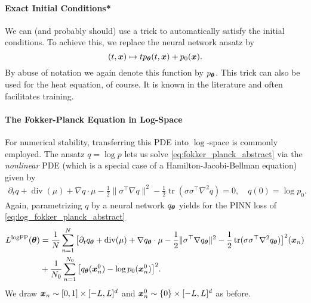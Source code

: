 \paragraph{Exact Initial Conditions*}
We can (and probably should) use a trick to automatically satisfy the initial conditions. To achieve this, we replace the neural network ansatz by 
\begin{equation}
    (t,{\bm{x}}) 
    \mapsto
    t p_{\bm{\theta}}(t,{\bm{x}}) + p_0({\bm{x}}).
\end{equation}
By abuse of notation we again denote this function by $p_{\bm{\theta}}$. This trick can also be used for the heat equation, of course. It is known in the literature and often facilitates training. 

\paragraph{The Fokker-Planck Equation in Log-Space}
For numerical stability, transferring this PDE into $\log$-space is commonly employed. The ansatz $q = \log p$ lets us solve \eqref{eq:fokker_planck_abstract} via the \emph{nonlinear} PDE (which is a special case of a Hamilton-Jacobi-Bellman equation) given by
\begin{align}\label{eq:log_fokker_planck_abstract}
    \partial_t q
    +
    \operatorname{div}(\mu)
    +
    \nabla q \cdot \mu
    -
    \frac12 \| \sigma^\top \nabla q \|^2
    -
    \frac12 \operatorname{tr}(\sigma \sigma^\top\nabla^2 q)
    =
    0,
    \quad
    q(0) = \log p_0.
\end{align}
Again, parametrizing $q$ by a neural network $q_{\bm{\theta}}$ yields for the PINN loss of \eqref{eq:log_fokker_planck_abstract}
\begin{align*}
    L^{\textrm{logFP}}({\bm{\theta}})
    &=
    \frac{1}{N}
    \sum_{n=1}^{N}
    \big[
    \partial_t q_{{\bm{\theta}}}
    +
    \operatorname{div}(\mu)
    +
    \nabla q_{\bm{\theta}} \cdot \mu
    -
    \frac12 \| \sigma^\top\nabla q_{\bm{\theta}} \|^2
    -
    \frac12 \operatorname{tr}(\sigma\sigma^\top\nabla^2 q_{{\bm{\theta}}})
    \big]^2
    ({\bm{x}}_n)
    \\
    &+
    \frac{1}{N_0}
    \sum_{n=1}^{N_0}
    \big[
    q_{{\bm{\theta}}}({\bm{x}}_n^0) - \log p_0({\bm{x}}_n^0)
    \big]^2.
\end{align*}
We draw ${\bm{x}}_n \sim [0, 1] \times [-L, L]^d$ and ${\bm{x}}_n^0 \sim \{0\} \times [-L, L]^d$ as before.


